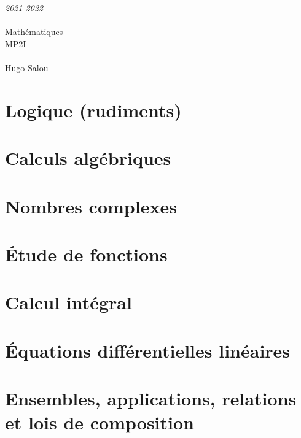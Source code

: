 \documentclass[a4paper]{report}
\newcommand{\chap}[2][0]{
    \setcounter{chapter}{#1 - 1}
    \chapter{#2}
    \renewcommand*\parttitle{#2}
}
\begin{document}
    \begin{titlepage}
        \begin{center}
            \vspace{10cm}
            {\Large \itshape 2021-2022}\\
            \vspace{3cm}
            \\
            \vspace{2mm}
            \vspace{0.5cm}
            {\HUGE Mathématiques}\\
            \vspace{0.5cm}
            {\fontsize{240pt}{260pt}\selectfont MP2I}\\
            \vspace{0.5cm}
            \\
            \vfill
            Hugo {\sc Salou}\\
        \end{center}
    \end{titlepage}
    \tableofcontents


	\chap[00]{Logique (rudiments)}
	\renewcommand{\cwd}{../chap00}
	
	
	
	
	

	\chap[01]{Calculs algébriques}
	\renewcommand{\cwd}{../chap01}
	
	
	
	
	
	

	\chap[02]{Nombres complexes}
	\renewcommand{\cwd}{../chap02}
	
	
	
	
	

	\chap[03]{Étude de fonctions}
	\renewcommand{\cwd}{../chap03}
	
	
	

	\chap[05]{Calcul intégral}
	\renewcommand{\cwd}{../chap05}
	

	\chap[06]{Équations différentielles linéaires}
	\renewcommand{\cwd}{../chap06}
	
	
	

	\chap[08]{Ensembles, applications, relations et lois de composition}
	\renewcommand{\cwd}{../chap08}
	
	
\end{document}
